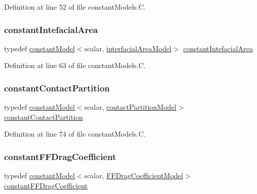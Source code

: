 Definition at line 52 of file constant\+Models.\+C.

\mbox{\label{namespaceFoam_a67d7b55001a14e8c5b32e3548c7cbc73}} 
\subsubsection{\texorpdfstring{constant\+Intefacial\+Area}{constantIntefacialArea}}
{\footnotesize\ttfamily typedef \hyperlink{classFoam_1_1constantModel}{constant\+Model}$<$scalar, \hyperlink{classFoam_1_1interfacialAreaModel}{interfacial\+Area\+Model}$>$ \hyperlink{namespaceFoam_a67d7b55001a14e8c5b32e3548c7cbc73}{constant\+Intefacial\+Area}}



Definition at line 63 of file constant\+Models.\+C.

\mbox{\label{namespaceFoam_a52a37eca9ce7726c3c7b8c585ac45fec}} 
\subsubsection{\texorpdfstring{constant\+Contact\+Partition}{constantContactPartition}}
{\footnotesize\ttfamily typedef \hyperlink{classFoam_1_1constantModel}{constant\+Model}$<$scalar, \hyperlink{classFoam_1_1contactPartitionModel}{contact\+Partition\+Model}$>$ \hyperlink{namespaceFoam_a52a37eca9ce7726c3c7b8c585ac45fec}{constant\+Contact\+Partition}}



Definition at line 74 of file constant\+Models.\+C.

\mbox{\label{namespaceFoam_af1318ccc11265440ed0af331cb695819}} 
\subsubsection{\texorpdfstring{constant\+F\+F\+Drag\+Coefficient}{constantFFDragCoefficient}}
{\footnotesize\ttfamily typedef \hyperlink{classFoam_1_1constantModel}{constant\+Model}$<$scalar, \hyperlink{classFoam_1_1FFDragCoefficientModel}{F\+F\+Drag\+Coefficient\+Model}$>$ \hyperlink{namespaceFoam_af1318ccc11265440ed0af331cb695819}{constant\+F\+F\+Drag\+Coefficient}}



